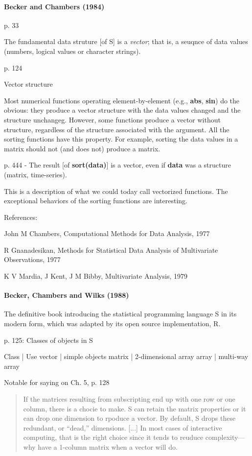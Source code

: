 \paragraph{Becker and Chambers (1984)~\cite{Becker1984}}

p. 33

The fundamental data struture [of S] is a \textit{vector}; that is, a seuqnce of data values (numbers, logical values or character strings).

p. 124

Vector structure

Most numerical functions operating element-by-element (e.g., \textbf{abs}, \textbf{sin}) do the obvious: they produce a vector structure with the data values changed and the structure unchangeg. However, some functions produce a vector without structure, regardless of the structure associated with the argument. All the sorting functions have this property. For example, sorting the data values in a matrix should not (and does not) produce a matrix.

p. 444 - The result [of \textbf{sort(data)}] is a vector, even if \textbf{data} was a structure (matrix, time-series).

This is a description of what we could today call vectorized functions. The exceptional behaviors of the sorting functions are interesting.

References:

John M Chambers, Computational Methods for Data Analysis, 1977

R Gnanadesikan, Methods for Statistical Data Analysis of Multivariate Observations, 1977

K V Mardia, J Kent, J M Bibby, Multivariate Analysis, 1979

\paragraph{Becker, Chambers and Wilks (1988)~\cite{Becker1988}}

The definitive book introducing the statistical programming language S in its
modern form, which was adapted by its open source implementation, R.

p. 125: Classes of objects in S

Class | Use
vector | simple objects
matrix | 2-dimensional array
array | multi-way array

Notable for saying on Ch. 5, p. 128

\begin{quote}
If the matrices resulting from subscripting end up with one row or one
column, there is a chocie to make. S can retain the matrix properties or it can
drop one dimension to rpoduce a vector. By default, S drops these redundant,
or ``dead,'' dimensions. [...]
In most cases of interactive computing, that is the right choice since it tends to
reuduce complexity---why have a 1-column matrix when a vector will do.
\end{quote}

